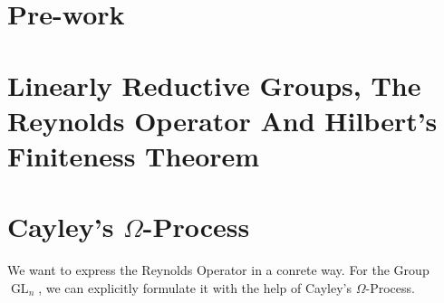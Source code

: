\documentclass{article}
\theoremstyle{prrt}
\begin{document}
\section{Pre-work}

\bigskip



\section{Linearly Reductive Groups, The Reynolds Operator And Hilbert's Finiteness Theorem}



\section{Cayley's $\Omega$-Process}

We want to express the Reynolds Operator in a conrete way.
For the Group $\operatorname{GL}_n$, we can explicitly formulate it with the help of Cayley's $\Omega$-Process.



% 
%
% 


\end{document}
